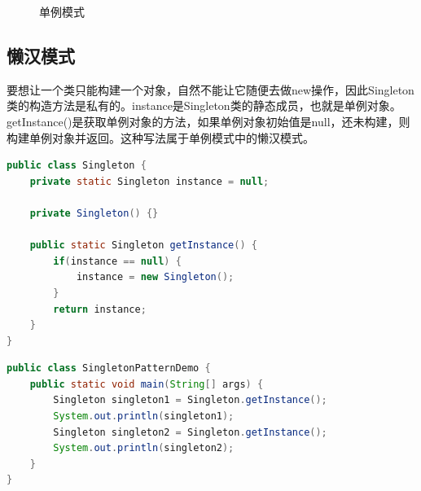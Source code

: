 \begin{figure}[H]
    \centering
    \caption{单例模式}
\end{figure}

\vspace{0.5cm}

\subsection{懒汉模式}

要想让一个类只能构建一个对象，自然不能让它随便去做new操作，因此Singleton类的构造方法是私有的。instance是Singleton类的静态成员，也就是单例对象。\\

getInstance()是获取单例对象的方法，如果单例对象初始值是null，还未构建，则构建单例对象并返回。这种写法属于单例模式中的懒汉模式。\\


\begin{lstlisting}[language=Java, title=Singleton.java]
public class Singleton {
    private static Singleton instance = null;

    private Singleton() {}

    public static Singleton getInstance() {
        if(instance == null) {
            instance = new Singleton();
        }
        return instance;
    }
}
\end{lstlisting}

\begin{lstlisting}[language=Java, title=SingletonPatternDemo.java]
public class SingletonPatternDemo {
    public static void main(String[] args) {
        Singleton singleton1 = Singleton.getInstance();
        System.out.println(singleton1);
        Singleton singleton2 = Singleton.getInstance();
        System.out.println(singleton2);
    }
}
\end{lstlisting}

